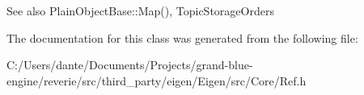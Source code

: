 \begin{DoxySeeAlso}{See also}
Plain\+Object\+Base\+::\+Map(), Topic\+Storage\+Orders 
\end{DoxySeeAlso}


The documentation for this class was generated from the following file\+:\begin{DoxyCompactItemize}
\item 
C\+:/\+Users/dante/\+Documents/\+Projects/grand-\/blue-\/engine/reverie/src/third\+\_\+party/eigen/\+Eigen/src/\+Core/Ref.\+h\end{DoxyCompactItemize}
